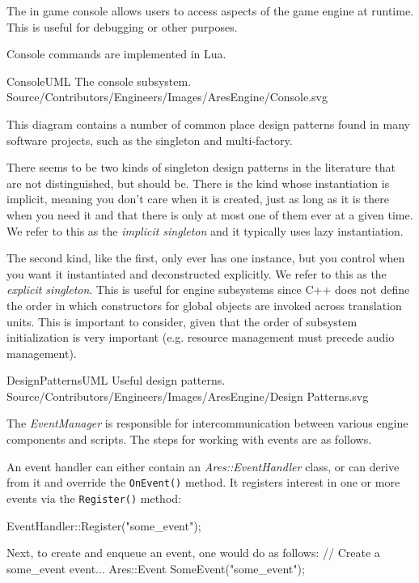\page
{}
The in game console allows users to access aspects of the game engine at runtime. This is useful for debugging or other purposes.

Console commands are implemented in Lua.

\FullPageDiagram
    {ConsoleUML}
    {The console subsystem.}
    {Source/Contributors/Engineers/Images/AresEngine/Console.svg}

\page
{}
This diagram contains a number of common place design patterns found in many software projects, such as the singleton and multi-factory. 

There seems to be two kinds of singleton design patterns in the literature that are not distinguished, but should be. There is the kind whose instantiation is implicit, meaning you don't care when it is created, just as long as it is there when you need it and that there is only at most one of them ever at a given time. We refer to this as the {\it implicit singleton} and it typically uses lazy instantiation.

The second kind, like the first, only ever has one instance, but you control when you want it instantiated and deconstructed explicitly. We refer to this as the {\it explicit singleton}. This is useful for engine subsystems since C++ does not define the order in which constructors for global objects are invoked across translation units. This is important to consider, given that the order of subsystem initialization is very important (e.g. resource management must precede audio management).

\FullPageDiagram
    {DesignPatternsUML}
    {Useful design patterns.}
    {Source/Contributors/Engineers/Images/AresEngine/Design Patterns.svg}

\page 
{}
The {\it EventManager} is responsible for intercommunication between various engine components and scripts. The steps for working with events are as follows.

An event handler can either contain an {\it Ares::EventHandler} class, or can derive from it and override the {\tt OnEvent()} method. It registers interest in one or more events via the {\tt Register()} method:

\startCodeExample
EventHandler::Register("some_event");
\stopCodeExample

Next, to create and enqueue an event, one would do as follows:
\startCodeExample
// Create a some_event event...
Ares::Event SomeEvent("some_event");

